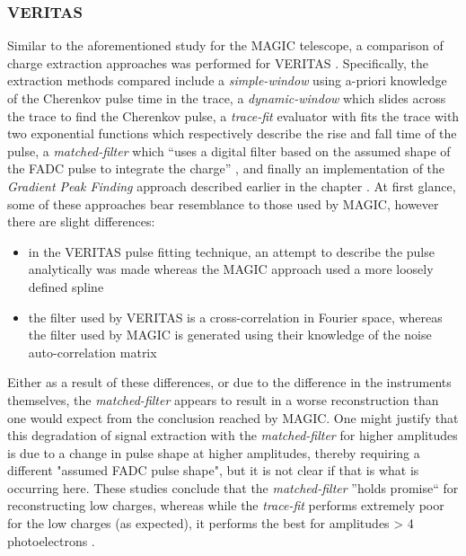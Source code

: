 \subsubsection{VERITAS}

Similar to the aforementioned study for the MAGIC telescope, a comparison of charge extraction approaches was performed for VERITAS \cite{Holder2005}\cite{Cogan2006}\cite{Cogan2007}. Specifically, the extraction methods compared include a \textit{simple-window} using a-priori knowledge of the Cherenkov pulse time in the trace, a \textit{dynamic-window} which slides across the trace to find the Cherenkov pulse, a \textit{trace-fit} evaluator with fits the trace with two exponential functions which respectively describe the rise and fall time of the pulse, a \textit{matched-filter} which ``uses a digital filter based on the assumed shape of the FADC pulse to integrate the charge'' \cite{Cogan2007}, and finally an implementation of the \textit{Gradient Peak Finding} approach described earlier in the chapter . At first glance, some of these approaches bear resemblance to those used by MAGIC, however there are slight differences: 
\begin{itemize}
	\item in the VERITAS pulse fitting technique, an attempt to describe the pulse analytically was made whereas the MAGIC approach used a more loosely defined spline
	\item the filter used by VERITAS is a cross-correlation in Fourier space, whereas the filter used by MAGIC is generated using their knowledge of the noise auto-correlation matrix
\end{itemize}

Either as a result of these differences, or due to the difference in the instruments themselves, the \textit{matched-filter} appears to result in a worse reconstruction than one would expect from the conclusion reached by MAGIC. One might justify that this degradation of signal extraction with the \textit{matched-filter} for higher amplitudes is due to a change in pulse shape at higher amplitudes, thereby requiring a different "assumed FADC pulse shape", but it is not clear if that is what is occurring here. These studies conclude that the \textit{matched-filter} ''holds promise`` for reconstructing low charges, whereas while the \textit{trace-fit} performs extremely poor for the low charges (as expected), it performs the best for amplitudes > 4 photoelectrons \cite{Cogan2007}.

